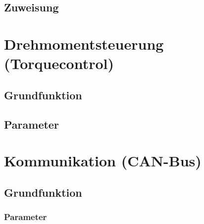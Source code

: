 \subsection{Zuweisung}


\section{Drehmomentsteuerung (Torquecontrol)}
\subsection{Grundfunktion}
\subsection{Parameter}


\section{Kommunikation (CAN-Bus)}
\subsection{Grundfunktion}
\subsubsection{Parameter}
